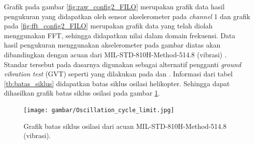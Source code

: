 Grafik pada gambar \ref{fig:raw_config2_FILO} merupakan grafik data hasil pengukuran yang didapatkan oleh sensor akselerometer pada \textit{channel} 1 dan grafik pada \ref{fig:fft_config2_FILO} merupakan grafik data yang telah diolah menggunakan FFT, sehingga didapatkan nilai dalam domain frekuensi. Data hasil pengukuran menggunakan akselerometer pada gambar diatas akan dibandingkan dengan acuan dari MIL-STD-810H-Method-514.8 (vibrasi) \cite{MILSTD}. Standar tersebut pada dasarnya digunakan sebagai alternatif pengganti \textit{ground vibration test} (GVT) seperti yang dilakukan pada \cite{lubrina:hal-01059708} dan \cite{Ciavarella2018AnEH}. Informasi dari tabel \ref{tb:batas_siklus} didapatkan batas siklus osilasi helikopter. Sehingga dapat dihasilkan grafik batas siklus osilasi pada gambar \ref{fig:batas_siklus}. 

\begin{figure}[h]
	\centering
	\texttt{[image: gambar/Oscillation\_cycle\_limit.jpg]}
	\caption{Grafik batas siklus osilasi dari acuan MIL-STD-810H-Method-514.8 (vibrasi).}
	\label{fig:batas_siklus}
\end{figure}

